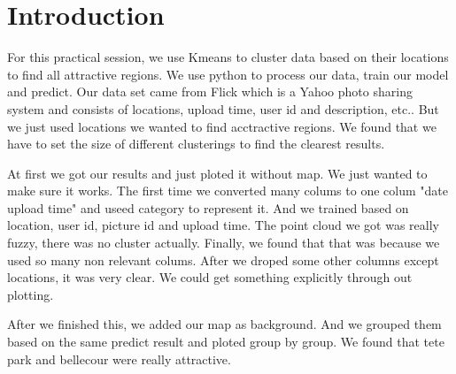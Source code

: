 \documentclass{article}
\begin{document}
\section*{Introduction}
For this practical session, we use Kmeans to cluster data based on their locations to find all attractive regions.
%
We use python to process our data, train our model and predict.
%
Our data set came from Flick which is a Yahoo photo sharing system and consists of locations, upload time, user id and description, etc.. 
%
But we just used locations we wanted to find acctractive regions.
%
We found that we have to set the size of different clusterings to find the clearest results.

\par

At first we got our results and just ploted it without map. We just wanted to make sure it works.
%
The first time we converted many colums to one colum "date upload time" and useed category to represent it.
%
And we trained based on location, user id, picture id and upload time.  
%
The point cloud we got was really fuzzy, there was no cluster actually.
%
Finally, we found that that was because we used so many non relevant colums.
%
After we droped some other columns except locations, it was very clear.
%
We could get something explicitly through out plotting.

\par
After we finished this, we added our map as background.
%
And we grouped them based on the same predict result and ploted group by group.
%
We found that tete park and bellecour were really attractive.
 
\end{document}
